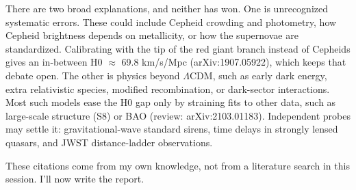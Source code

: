 \documentclass[11pt,a4paper]{article}
\begin{document}
There are two broad explanations, and neither has won. One is unrecognized systematic errors. These could include Cepheid crowding and photometry, how Cepheid brightness depends on metallicity, or how the supernovae are standardized. Calibrating with the tip of the red giant branch instead of Cepheids gives an in-between H0 $\approx$ 69.8 km/s/Mpc (arXiv:1907.05922), which keeps that debate open. The other is physics beyond $\Lambda$CDM, such as early dark energy, extra relativistic species, modified recombination, or dark-sector interactions. Most such models ease the H0 gap only by straining fits to other data, such as large-scale structure (S8) or BAO (review: arXiv:2103.01183). Independent probes may settle it: gravitational-wave standard sirens, time delays in strongly lensed quasars, and JWST distance-ladder observations.

These citations come from my own knowledge, not from a literature search in this session. I'll now write the report.
\end{document}
